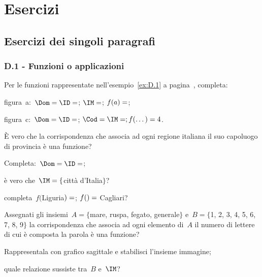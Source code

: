 \section{Esercizi}
\subsection{Esercizi dei singoli paragrafi}
\subsubsection*{D.1 - Funzioni o applicazioni}
\begin{esercizio}
 \label{ese:D.1}
 Per le funzioni rappresentate nell'esempio~\ref{ex:D.1} a pagina~\pageref{ex:D.1}, completa:

 \begin{itemize*}
\item figura~a:~$\Dom =\ID = \dotfill$; $\IM = \dotfill$; $f(a) = \dotfill$;
\item figura~c:~$\Dom = \ID = \dotfill$; $\Cod = \IM = \dotfill; f(\dots)= 4$.
\end{itemize*}
 \end{esercizio}

\begin{esercizio}
 \label{ese:D.2}
È vero che la corrispondenza che associa ad ogni regione italiana il suo capoluogo di provincia è una
funzione?

\begin{enumeratea}
\item Completa:~$\Dom = \ID = \dotfill$;
\item è vero che~$\IM = \{$città d'Italia$\}$?
\item completa~$f($Liguria$)=\dotfill$; $f(\dotfill)=$ Cagliari?
\end{enumeratea}
\end{esercizio}

\begin{esercizio}
 \label{ese:D.3}
Assegnati gli insiemi~$A=\{$mare, ruspa, fegato, generale$\}$ e~$B=\{$1, 2, 3, 4, 5, 6, 7, 8, 9$\}$ la corrispondenza
che associa ad ogni elemento di~$A$ il numero di lettere di cui è
composta la parola è una funzione?

\begin{enumeratea}
\item Rappresentala con grafico sagittale e stabilisci l'insieme immagine;
\item quale relazione sussiste tra~$B$ e~$\IM$?
\end{enumeratea}
\end{esercizio}


